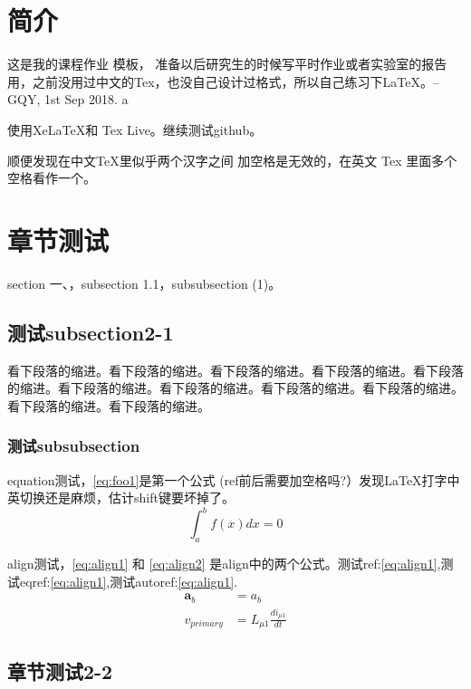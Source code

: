 \documentclass{myreport}
\begin{document}
\thispagestyle{empty}
\makemycover %




\clearpage
\newpage

\section{简介}
这是我的课程作业   模板，    准备以后研究生的时候写平时作业或者实验室的报告用，之前没用过中文的Tex，也没自己设计过格式，所以自己练习下\LaTeX。--GQY, 1st Sep 2018. a

使用XeLaTeX和 Tex Live。继续测试github。

顺便发现在中文TeX里似乎两个汉字之间   加空格是无效的，在英文 Tex 里面多个空格看作一个。


\section{章节测试}
section 一、，subsection 1.1，subsubsection (1)。
\subsection{测试subsection2-1}
看下段落的缩进。看下段落的缩进。看下段落的缩进。看下段落的缩进。看下段落的缩进。看下段落的缩进。看下段落的缩进。看下段落的缩进。看下段落的缩进。看下段落的缩进。看下段落的缩进。
\subsubsection{测试subsubsection}
equation测试，\eqref{eq:foo1}是第一个公式
{\color{red}(ref前后需要加空格吗?）}发现\LaTeX 打字中英切换还是麻烦，估计shift键要坏掉了。
\begin{equation}
\int_a^b f(x)dx = 0 \label{eq:foo1}
\end{equation}

align测试，\eqref{eq:align1} 和 \eqref{eq:align2} 是align中的两个公式。测试ref:\ref{eq:align1},测试eqref:\eqref{eq:align1},测试autoref:\autoref{eq:align1}.
\begin{align}
 \bm{a}_b &= a_b \label{eq:align1}\\
 v_{primary} &= L_{\mu 1}\frac{di_{\mu 1}}{dt} \label{eq:align2} 
\end{align}


\subsection{章节测试2-2}
\end{document}
